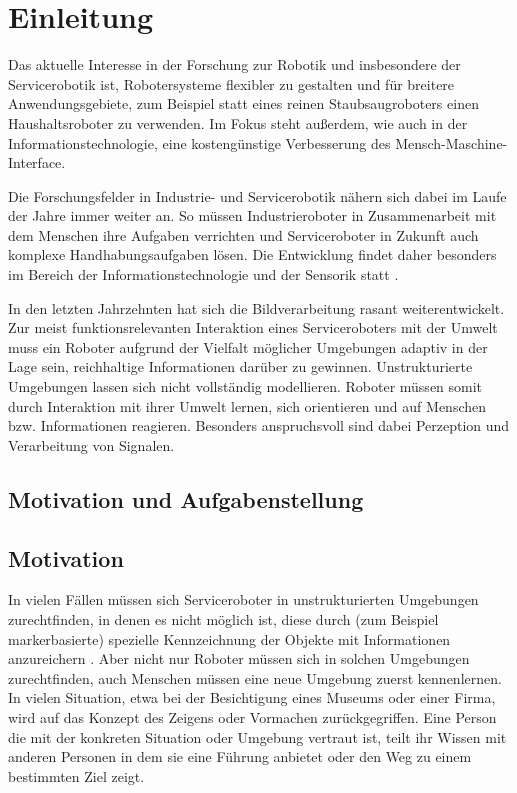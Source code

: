 \chapter{Einleitung}
\label{einleitung_cha}
Das aktuelle Interesse in der Forschung zur Robotik und insbesondere der Servicerobotik ist, Robotersysteme flexibler zu gestalten und für breitere Anwendungsgebiete, zum Beispiel statt eines reinen Staubsaugroboters einen Haushaltsroboter zu verwenden.
Im Fokus steht außerdem, wie auch in der Informationstechnologie, eine kostengünstige Verbesserung des Mensch-Maschine-Interface.
 \citep{IP08}

Die Forschungsfelder in Industrie- und Servicerobotik nähern sich dabei im Laufe der Jahre immer weiter an.
 So müssen Industrieroboter in Zusammenarbeit mit dem Menschen ihre Aufgaben verrichten und Serviceroboter
 in Zukunft auch komplexe Handhabungsaufgaben lösen. Die Entwicklung findet daher besonders im Bereich der
 Informationstechnologie und der Sensorik statt \citep{Michael2010}.
 
In den letzten Jahrzehnten hat sich die Bildverarbeitung rasant weiterentwickelt.
 Zur meist funktionsrelevanten Interaktion eines Serviceroboters mit der Umwelt muss
 ein Roboter aufgrund der Vielfalt möglicher Umgebungen adaptiv in der Lage sein, reichhaltige
 Informationen darüber zu gewinnen. Unstrukturierte Umgebungen lassen sich nicht vollständig modellieren.
 Roboter müssen somit durch Interaktion mit ihrer Umwelt lernen, sich orientieren und auf Menschen bzw. Informationen reagieren.
 Besonders anspruchsvoll sind dabei Perzeption und Verarbeitung von Signalen.

\section{Motivation und Aufgabenstellung}
\label{motivation_sec}
\authorsection{\editorjulian, \editortobias}

\section{Motivation}
\label{motivation_real_sec}


In vielen Fällen müssen sich Serviceroboter in unstrukturierten Umgebungen zurechtfinden, in denen es nicht möglich ist, diese durch
 (zum Beispiel markerbasierte) spezielle Kennzeichnung der Objekte mit Informationen anzureichern \citep{sturm10rss-workshop}. Aber nicht nur Roboter müssen sich in solchen Umgebungen zurechtfinden, auch Menschen müssen eine neue Umgebung zuerst kennenlernen. In vielen Situation, etwa bei der Besichtigung eines Museums oder einer Firma, wird auf das Konzept des Zeigens oder Vormachen zurückgegriffen. Eine Person die mit der konkreten Situation oder Umgebung vertraut ist, teilt ihr Wissen mit anderen Personen in dem sie eine Führung anbietet oder den Weg zu einem bestimmten Ziel zeigt.

